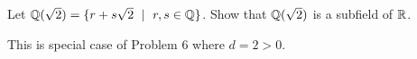 \documentclass[../hw3]{subfiles}
\begin{document}
\begin{problem}
Let $\Q(\sqrt{2} ) = \{r + s\sqrt{2}\ \mid\ r,s \in \Q  \} $.
Show that $\mathbb{Q}(\sqrt{2} )$ is a subfield of $\mathbb{R}$.
\end{problem}
This is special case of Problem 6 where $d=2>0$.
\end{document}
